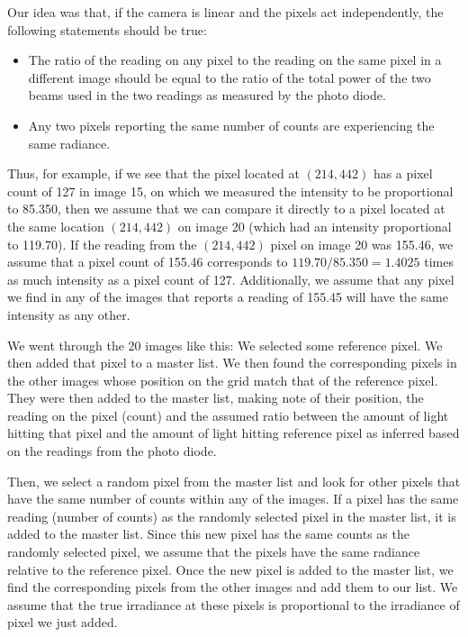 Our idea was that, if the camera is linear and the pixels act independently, the following statements should be true: 
\begin{itemize}
\item The ratio of the reading on any pixel to the reading on the same pixel in a different image should be equal to the ratio of the total power of the two beams used in the two readings as measured by the photo diode. 
\item Any two pixels reporting the same number of counts are experiencing the same radiance.
\end{itemize}

Thus, for example, if we see that the pixel located at $(214,442)$ has a pixel count of 127 in image 15, on which we measured the intensity to be proportional to 85.350, then we assume that we can compare it directly to a pixel located at the same location $(214,442)$ on image 20 (which had an intensity proportional to 119.70). If the reading from the $(214,442)$ pixel on image 20 was 155.46, we assume that a pixel count of 155.46 corresponds to $119.70/85.350=1.4025$ times as much intensity as a pixel count of 127. Additionally, we assume that any pixel we find in any of the images that reports a reading of 155.45 will have the same intensity as any other. 

We went through the 20 images like this: We selected some reference pixel. We then added that pixel to a master list. We then found the corresponding pixels in the other images whose position on the grid match that of the reference pixel. They were then added to the master list, making note of their position, the reading on the pixel (count) and the assumed ratio between the amount of light hitting that pixel and the amount of light hitting reference pixel as inferred based on the readings from the photo diode.

Then, we select a random pixel from the master list and look for other pixels that have the same number of counts within any of the images. If a pixel has the same reading (number of counts) as the randomly selected pixel in the master list, it is added to the master list. Since this new pixel has the same counts as the randomly selected pixel, we assume that the pixels have the same radiance relative to the reference pixel. Once the new pixel is added to the master list, we find the corresponding pixels from the other images and add them to our list. We assume that the true irradiance at these pixels is proportional to the irradiance of pixel we just added. 


